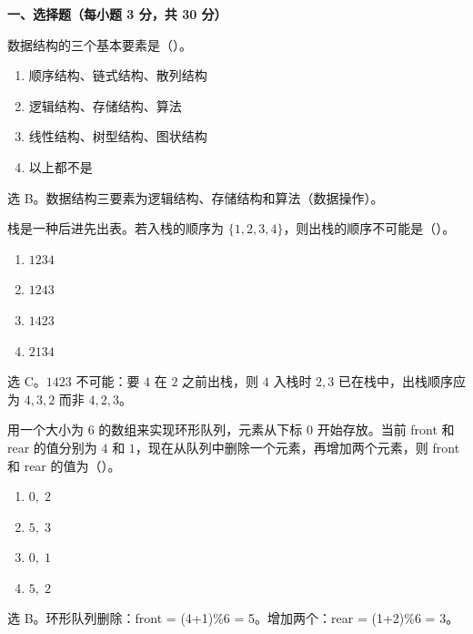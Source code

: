 
\textbf{一、选择题（每小题 3 分，共 30 分）}

\begin{question}
数据结构的三个基本要素是（\quad）。
\begin{enumerate}
  \item 顺序结构、链式结构、散列结构
  \item 逻辑结构、存储结构、算法
  \item 线性结构、树型结构、图状结构
  \item 以上都不是
\end{enumerate}
\begin{solution}
选 B。数据结构三要素为逻辑结构、存储结构和算法（数据操作）。
\end{solution}
\end{question}

\begin{question}
栈是一种后进先出表。若入栈的顺序为 $\{1,2,3,4\}$，则出栈的顺序不可能是（\quad）。
\begin{enumerate}
  \item $1234$
  \item $1243$
  \item $1423$
  \item $2134$
\end{enumerate}
\begin{solution}
选 C。$1423$ 不可能：要 $4$ 在 $2$ 之前出栈，则 $4$ 入栈时 $2,3$ 已在栈中，出栈顺序应为 $4,3,2$ 而非 $4,2,3$。
\end{solution}
\end{question}

\begin{question}
用一个大小为 $6$ 的数组来实现环形队列，元素从下标 $0$ 开始存放。当前 front 和 rear 的值分别为 $4$ 和 $1$，现在从队列中删除一个元素，再增加两个元素，则 front 和 rear 的值为（\quad）。
\begin{enumerate}
  \item $0,\;2$
  \item $5,\;3$
  \item $0,\;1$
  \item $5,\;2$
\end{enumerate}
\begin{solution}
选 B。环形队列删除：front = (4+1)\%6 = 5。增加两个：rear = (1+2)\%6 = 3。
\end{solution}
\end{question}

